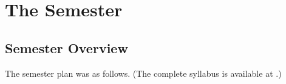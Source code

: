 \documentclass{article}
\begin{document}
\section{The Semester}

\begin{comment}
Solution: I took the union of all theories of design, and announced on
the first day that the entire field of software design is a matter of
opinion (including this very statement). %


\end{comment}

\subsection{Semester Overview}

The semester plan was as follows. (The complete syllabus is available at
\cite{kovitz2025cs356syllabus}.)
\end{document}
